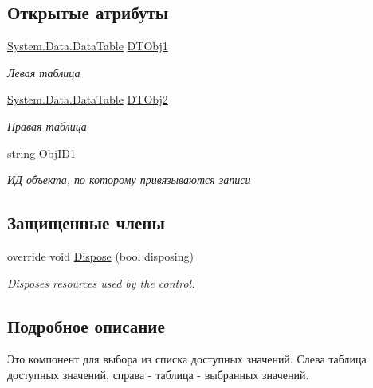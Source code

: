 \subsection*{Открытые атрибуты}
\begin{DoxyCompactItemize}
\item 
\mbox{\hyperlink{_sys_static_8cs_a6542cfcff2f8e81f06ade15aa0bfe2b7}{System.\+Data.\+Data\+Table}} \mbox{\hyperlink{class_f_b_a_1_1_sys_obj_add_af71f217693023c47f1352f31acd7a332}{D\+T\+Obj1}}
\begin{DoxyCompactList}\small\item\em Левая таблица \end{DoxyCompactList}\item 
\mbox{\hyperlink{_sys_static_8cs_a6542cfcff2f8e81f06ade15aa0bfe2b7}{System.\+Data.\+Data\+Table}} \mbox{\hyperlink{class_f_b_a_1_1_sys_obj_add_a916e9b266ea88aa2a42d98419f037ea4}{D\+T\+Obj2}}
\begin{DoxyCompactList}\small\item\em Правая таблица \end{DoxyCompactList}\item 
string \mbox{\hyperlink{class_f_b_a_1_1_sys_obj_add_ad0aead348bebf3f139d9fca7ba6b443e}{Obj\+I\+D1}}
\begin{DoxyCompactList}\small\item\em ИД объекта, по которому привязываются записи \end{DoxyCompactList}\end{DoxyCompactItemize}
\subsection*{Защищенные члены}
\begin{DoxyCompactItemize}
\item 
override void \mbox{\hyperlink{class_f_b_a_1_1_sys_obj_add_acdd3f1a2189c4c076e2f999065e3eee5}{Dispose}} (bool disposing)
\begin{DoxyCompactList}\small\item\em Disposes resources used by the control. \end{DoxyCompactList}\end{DoxyCompactItemize}


\subsection{Подробное описание}
Это компонент для выбора из списка доступных значений. Слева таблица доступных значений, справа -\/ таблица -\/ выбранных значений. 



